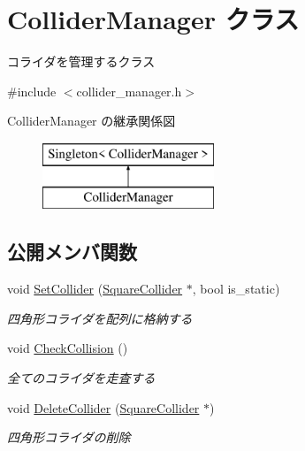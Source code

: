 \hypertarget{class_collider_manager}{}\section{Collider\+Manager クラス}
\label{class_collider_manager}


コライダを管理するクラス  




{\ttfamily \#include $<$collider\+\_\+manager.\+h$>$}

Collider\+Manager の継承関係図\begin{figure}[H]
\begin{center}
\leavevmode
\includegraphics[height=2.000000cm]{class_collider_manager}
\end{center}
\end{figure}
\subsection*{公開メンバ関数}
\begin{DoxyCompactItemize}
\item 
void \mbox{\hyperlink{class_collider_manager_acf6822be802b18cd2f0ea50b2ba00d63}{Set\+Collider}} (\mbox{\hyperlink{class_square_collider}{Square\+Collider}} $\ast$, bool is\+\_\+static)
\begin{DoxyCompactList}\small\item\em 四角形コライダを配列に格納する \end{DoxyCompactList}\item 
void \mbox{\hyperlink{class_collider_manager_af3863143e206b4c86c8b89dd91ff3c8c}{Check\+Collision}} ()
\begin{DoxyCompactList}\small\item\em 全てのコライダを走査する \end{DoxyCompactList}\item 
void \mbox{\hyperlink{class_collider_manager_afb805cdb8c6e5872d54ecbb9368ba38d}{Delete\+Collider}} (\mbox{\hyperlink{class_square_collider}{Square\+Collider}} $\ast$)
\begin{DoxyCompactList}\small\item\em 四角形コライダの削除 \end{DoxyCompactList}\end{DoxyCompactItemize}
